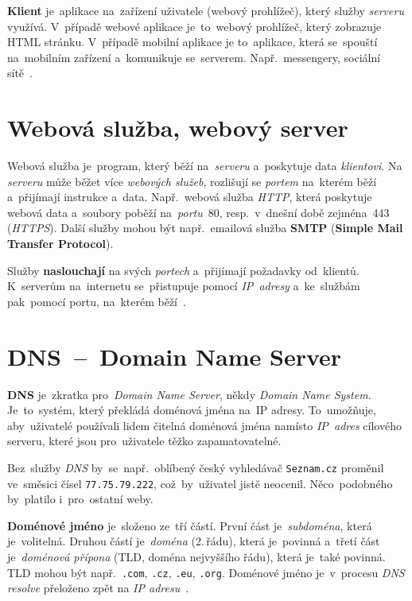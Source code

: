 \documentclass[11pt,a4paper]{report}
\begin{document}
            \textbf{Klient} je~aplikace na~zařízení uživatele (webový prohlížeč), který služby \emph{serveru} využívá. V~případě webové aplikace je~to~webový prohlížeč, který zobrazuje HTML stránku. V~případě mobilní aplikace je to~aplikace, která se~spouští na~mobilním zařízení a~komunikuje se~serverem. Např.~messengery, sociální sítě~\cite{ClientServer}.

        \section{Webová služba, webový server}
            Webová služba je~program, který běží na~\emph{serveru} a~poskytuje data \emph{klientovi}. Na \emph{serveru} může běžet více \emph{webových služeb}, rozlišují se \emph{portem} na~kterém běží a~přijímají instrukce a~data. Např.~webová služba \emph{HTTP}, která poskytuje webová data a~soubory poběží na~\emph{portu}~80, resp.~v~dnešní době zejména~443 (\emph{HTTPS}). Další služby mohou být např.~emailová služba \textbf{SMTP} (\textbf{Simple Mail Transfer Protocol}).
            
            Služby \textbf{naslouchají} na svých \emph{portech} a~přijímají požadavky od~klientů. K~serverům na~internetu se~přistupuje pomocí \emph{IP~adresy} a~ke~službám pak~pomocí portu, na~kterém běží~\cite{webserver:mdn}.

        \section{DNS~--~Domain Name Server}
            \textbf{DNS} je~zkratka pro~\emph{Domain Name Server}, někdy \emph{Domain Name System}. Je~to~systém, který překládá doménová jména na~IP adresy. To~umožňuje, aby~uživatelé používali lidem čitelná doménová jména namísto \emph{IP~adres} cílového serveru, které jsou pro~uživatele těžko zapamatovatelné.
            
            Bez~služby \emph{DNS} by~se~např.~oblíbený český vyhledávač \texttt{Seznam.cz} proměnil ve~směsici čísel \texttt{77.75.79.222}, což~by~uživatel jistě neocenil. Něco~podobného by~platilo i~pro~ostatní weby.

            \textbf{Doménové jméno} je~složeno ze~tří částí. První část je~\emph{subdoména}, která je~volitelná. Druhou částí je~\emph{doména} (2.\,řádu), která je~povinná a~třetí část je~\emph{doménová přípona} (TLD, doména nejvyššího řádu), která je~také povinná. TLD mohou být např.~\texttt{.com}, \texttt{.cz}, \texttt{.eu}, \texttt{.org}. Doménové jméno je~v~procesu \emph{DNS resolve} přeloženo zpět na \emph{IP adresu}~\cite{tld:mdn}.
        
\end{document}
